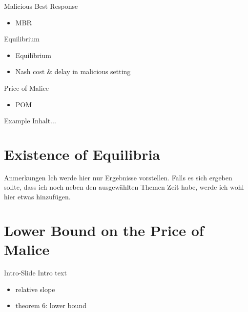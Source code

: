 \documentclass{beamer}
\begin{document}
\begin{frame}{Malicious Best Response}
	\begin{itemize}
		\item MBR
	\end{itemize}
\end{frame}

\begin{frame}{Equilibrium}
	\begin{itemize}
		\item Equilibrium
		\item Nash cost \& delay in malicious setting
	\end{itemize}
\end{frame}

\begin{frame}{Price of Malice}
	\begin{itemize}
		\item POM 
	\end{itemize}
\end{frame}

\begin{frame}{Example}
	Inhalt...
\end{frame}


\section{Existence of Equilibria}
\begin{frame}{Anmerkungen}
	Ich werde hier nur Ergebnisse vorstellen.
	Falls es sich ergeben sollte, dass ich noch neben den ausgewählten Themen Zeit habe, werde ich wohl hier etwas hinzufügen.
\end{frame}


\section{Lower Bound on the Price of Malice}

\begin{frame}{Intro-Slide}
	Intro text
\end{frame}

\begin{frame}
	\begin{itemize}
		\item relative slope
		\item theorem 6: lower bound
	\end{itemize}
\end{frame}
\end{document}
